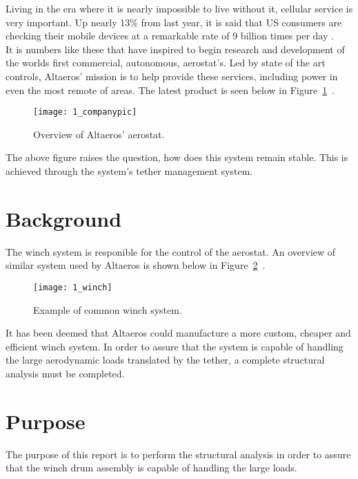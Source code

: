 \label{chapt:intro}

Living in the era where it is nearly impossible to live without it, cellular service is very important. Up nearly 13\% from last year, it is said that US consumers are checking their mobile devices at a remarkable rate of 9 billion times per day \cite{deloittestat}.\\

It is numbers like these that have inspired \Company to begin research and development of the worlds first commercial, autonomous, aerostat's. Led by state of the art controls, Altaeros' mission is to help provide these services, including power in even the most remote of areas. The latest product is seen below in Figure~\ref{fig:1_companypic}~\cite{companypicweb}.

\begin{figure}[H]
	\centering
	\texttt{[image: 1\_companypic]}
	\caption{Overview of Altaeros' aerostat.}\protect\cite{companypicweb}
	\label{fig:1_companypic}
\end{figure}


The above figure raises the question, how does this system remain stable. This is achieved through the system's tether management system.

\section{Background} %

The winch system is responible for the control of the aerostat. An overview of similar system used by Altaeros is shown below in Figure~\ref{fig:1_winch}~\cite{winchpic}.
\begin{figure}[H]
	\centering
	\texttt{[image: 1\_winch]}
	\caption{Example of common winch system.}\protect\cite{winchpic}
	\label{fig:1_winch}
\end{figure}

It has been deemed that Altaeros could manufacture a more custom, cheaper and efficient winch system. In order to assure that the system is capable of handling the large aerodynamic loads translated by the tether, a complete structural analysis must be completed.

\section{Purpose}
The purpose of this report is to perform the structural analysis in order to assure that the winch drum assembly is capable of handling the large loads.\\

